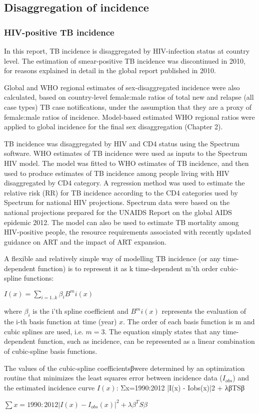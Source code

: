 \subsection{Disaggregation of incidence}
\subsubsection{HIV-positive TB incidence}

In this report, TB incidence is disaggregated by HIV-infection status at country level. The estimation of smear-positive TB incidence was discontinued in 2010, for reasons explained in detail in the global report published in 2010.

Global and WHO regional estimates of sex-disaggregated incidence were also calculated, based on country-level female:male ratios of total new and relapse (all case types) TB case notifications, under the assumption that they are a proxy of female:male ratios of incidence. Model-based estimated WHO regional ratios were applied to global incidence for the final sex disaggregation (Chapter 2).  

TB incidence was disaggregated by HIV and CD4 status using the Spectrum software\cite{Stover2012}. WHO estimates of TB incidence were used as inputs to the Spectrum HIV model. The model was fitted to WHO estimates of TB incidence, and then used to produce estimates of TB incidence among people living with HIV disaggregated by CD4 category. A regression method was used to estimate the relative risk (RR) for TB incidence according to the CD4 categories used by Spectrum for national HIV projections\cite{J2010}. Spectrum data were based on the national projections prepared for the UNAIDS Report on the global AIDS epidemic 2012. The model can also be used to  estimate TB mortality among HIV-positive people, the resource requirements associated with  recently updated guidance on ART and the impact of ART expansion. 

A flexible and relatively simple way of modelling TB incidence (or any time-dependent function) is to represent it as k time-dependent m’th order cubic-spline functions:

$I(x) = \sum_{i=1 .. k} \beta_i B^m i(x)$

where $\beta_i$ is the i'th spline coefficient and $B^m i(x)$ represents the evaluation of the i-th basis function at time (year) $x$. The order of each basis function is m and cubic splines are used, i.e. $m=3$. The equation simply states that any time-dependent function, such as incidence, can be represented as a linear combination of cubic-spline basis functions.

The values of the cubic-spline coefficientsβwere determined by an optimization routine that minimizes the least squares error between incidence data ($I_{obs}$) and the estimated incidence curve $I(x)$:
Σx=1990:2012 |I(x) - Iobs(x)|2 + λβTSβ

$\sum x = 1990:2012 | I(x) - I_{obs} (x)|^2 + \lambda \beta^T S \beta$

